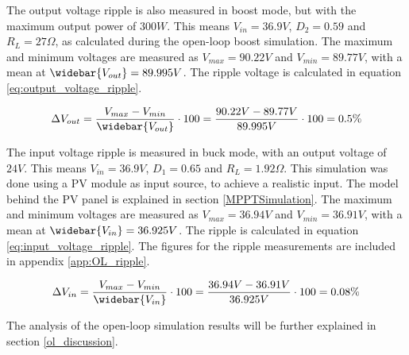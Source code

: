 The output voltage ripple is also measured in boost mode, but with the maximum output power of $300W$. This means $V_{in} = 36.9V$, $D_{2} = 0.59$ and $R_{L} = 27\Omega$, as calculated during the open-loop boost simulation. The maximum and minimum voltages are measured as $V_{max} = 90.22V$ and $V_{min} = 89.77V$, with a mean at $\widebar{V_{out}} = 89.995V$. The ripple voltage is calculated in equation \ref{eq:output_voltage_ripple}.

\begin{equation} \label{eq:output_voltage_ripple}
\Delta V_{out} = \frac{V_{max}-V_{min}}{\widebar{V_{out}}} \cdot 100 = \frac{90.22V-89.77V}{89.995V} \cdot 100 = 0.5\%
\end{equation}

The input voltage ripple is measured in buck mode, with an output voltage of $24V$. This means $V_{in} = 36.9V$, $D_{1} = 0.65$ and $R_{L} = 1.92\Omega$. This simulation was done using a PV module as input source, to achieve a realistic input. The model behind the PV panel is explained in section \ref{MPPTSimulation}. The maximum and minimum voltages are measured as $V_{max} = 36.94V$ and $V_{min} = 36.91V$, with a mean at $\widebar{V_{in}} = 36.925V$. The ripple is calculated in equation \ref{eq:input_voltage_ripple}. The figures for the ripple measurements are included in appendix \ref{app:OL_ripple}.

\begin{equation} \label{eq:input_voltage_ripple}
\Delta V_{in} = \frac{V_{max}-V_{min}}{\widebar{V_{in}}} \cdot 100 = \frac{36.94V-36.91V}{36.925V} \cdot 100 = 0.08\%
\end{equation}

The analysis of the open-loop simulation results will be further explained in section \ref{ol_discussion}.